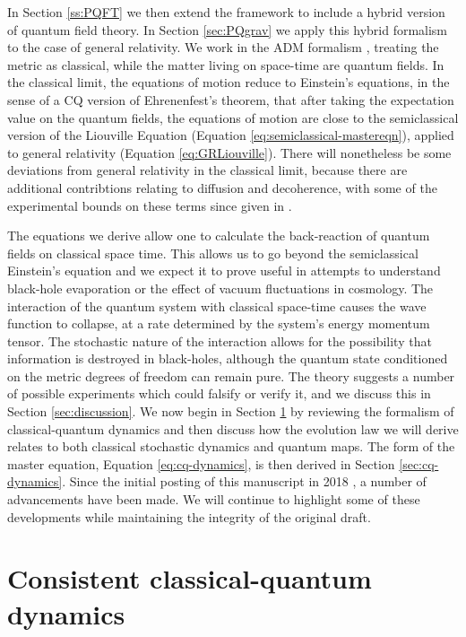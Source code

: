 \documentclass[aps,pra,showpacs,citeautoscript,amsmath,amssymb,floatfix,superscriptaddress,bbm, verbatim,amsfonts,changes,11pt,nofootinbib,longbibliography]{revtex4-2}
\begin{document}
In Section \ref{ss:PQFT} we then extend the framework to include a hybrid version of quantum field theory. In Section \ref{sec:PQgrav} we apply this hybrid formalism to the case of general relativity. We work in the ADM formalism \cite{arnowitt2008republication}, treating the metric as classical, while the matter living on space-time are quantum fields. %
	In the classical limit, the  equations of motion reduce to Einstein's equations, in the sense of a CQ version of Ehrenenfest's theorem, that after taking the expectation value on the quantum fields, the equations of motion are close to the semiclassical version of the Liouville Equation (Equation \eqref{eq:semiclassical-mastereqn}), applied to general relativity (Equation \eqref{eq:GRLiouville}).
There will nonetheless be some deviations from general relativity in the classical limit, because there are additional contribtions relating to diffusion and decoherence, with some of the experimental bounds on these terms since given in  \cite{oppenheim2021gravitationally}.
\label{par:Climit}

The equations we derive allow one to calculate the back-reaction of quantum fields on classical space time. This allows us to go beyond the semiclassical Einstein's equation and we expect it to prove useful in attempts to understand black-hole evaporation or the effect of vacuum fluctuations in cosmology.
 The interaction of the quantum system with classical space-time causes the wave function to collapse, at a rate determined by the system's energy momentum tensor. The stochastic nature of the interaction allows for the possibility that information is destroyed in black-holes, although the quantum state conditioned on the metric degrees of freedom can remain pure. The theory suggests a number of possible experiments which could falsify or verify it, and we discuss this in Section \ref{sec:discussion}.
We now begin in Section \ref{sec:cq-review} by reviewing the formalism of classical-quantum dynamics and then discuss how the evolution law we will derive relates to both classical stochastic dynamics and quantum maps. The form of the master equation, Equation \eqref{eq:cq-dynamics}, is then derived in Section \ref{sec:cq-dynamics}. 
Since the initial posting of this manuscript in 2018 \cite{oppenheim2018postArxiv}, a number of advancements have been made. We will continue to highlight some of these developments while maintaining the integrity of the original draft.



 
\section{Consistent classical-quantum dynamics}
\label{sec:cq-review}
\end{document}
